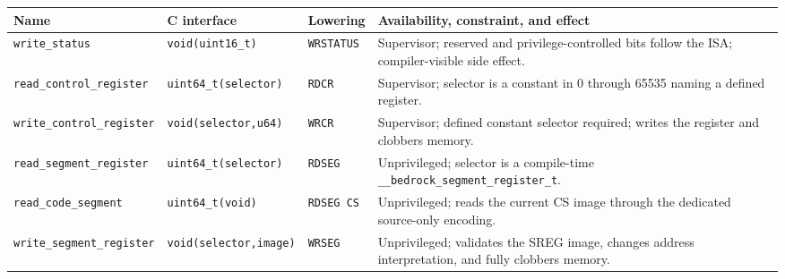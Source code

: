 \begingroup\footnotesize
\setlength{\tabcolsep}{2pt}
\begin{longtable}{@{}p{1.4in}p{1.3in}p{0.7in}p{2.2in}@{}}
\toprule
\textbf{Name} & \textbf{C interface} & \textbf{Lowering} & \textbf{Availability, constraint, and effect}\\
\midrule
\endhead
\texttt{write\_status} & \texttt{void(uint16\_t)} & \texttt{WRSTATUS} & Supervisor; reserved and privilege-controlled bits follow the ISA; compiler-visible side effect.\\
\texttt{read\_control\_register} & \texttt{uint64\_t(selector)} & \texttt{RDCR} & Supervisor; selector is a constant in 0 through 65535 naming a defined register.\\
\texttt{write\_control\_register} & \texttt{void(selector,u64)} & \texttt{WRCR} & Supervisor; defined constant selector required; writes the register and clobbers memory.\\
\texttt{read\_segment\_register} & \texttt{uint64\_t(selector)} & \texttt{RDSEG} & Unprivileged; selector is a compile-time \texttt{\_\_bedrock\_segment\_register\_t}.\\
\texttt{read\_code\_segment} & \texttt{uint64\_t(void)} & \texttt{RDSEG CS} & Unprivileged; reads the current CS image through the dedicated source-only encoding.\\
\texttt{write\_segment\_register} & \texttt{void(selector,image)} & \texttt{WRSEG} & Unprivileged; validates the SREG image, changes address interpretation, and fully clobbers memory.\\
\bottomrule
\end{longtable}
\endgroup
